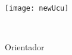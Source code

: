 \makeatletter
\begin{titlepage}
    \begin{center}
        \texttt{[image: newUcu]}

	\vspace*{3cm}

	{\Huge \textbf{\thetitle} \par}

	{\Large \@subtitle \par}

	\vspace*{1.0cm}

	{\LARGE \@course \par}

	\vspace*{3.5cm}

	{\LARGE \theauthor \par}

	\vspace*{1.0cm}

	{\LARGE \@supervisor\\
	{\large Orientador \par} \par}

        \vfill

	{\Large \@institute}

	{\Large \thedate \par}

    \end{center}
\end{titlepage}
\makeatother

